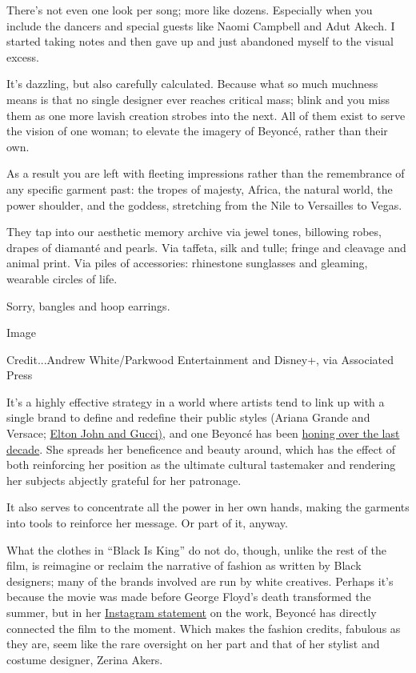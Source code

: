 There's not even one look per song; more like dozens. Especially when
you include the dancers and special guests like Naomi Campbell and Adut
Akech. I started taking notes and then gave up and just abandoned myself
to the visual excess.

It's dazzling, but also carefully calculated. Because what so much
muchness means is that no single designer ever reaches critical mass;
blink and you miss them as one more lavish creation strobes into the
next. All of them exist to serve the vision of one woman; to elevate the
imagery of Beyoncé, rather than their own.

As a result you are left with fleeting impressions rather than the
remembrance of any specific garment past: the tropes of majesty, Africa,
the natural world, the power shoulder, and the goddess, stretching from
the Nile to Versailles to Vegas.

They tap into our aesthetic memory archive via jewel tones, billowing
robes, drapes of diamanté and pearls. Via taffeta, silk and tulle;
fringe and cleavage and animal print. Via piles of accessories:
rhinestone sunglasses and gleaming, wearable circles of life.

Sorry, bangles and hoop earrings.

Image

Credit...Andrew White/Parkwood Entertainment and Disney+, via Associated
Press

It's a highly effective strategy in a world where artists tend to link
up with a single brand to define and redefine their public styles
(Ariana Grande and Versace;
\href{https://www.nytimes.com/2018/09/07/style/elton-john-farewell-tour-wardrobe-gucci.html}{Elton
John and Gucci)}, and one Beyoncé has been
\href{https://www.nytimes.com/2016/04/26/fashion/fashion-beyonce-lemonade.html}{honing
over the last decade}. She spreads her beneficence and beauty around,
which has the effect of both reinforcing her position as the ultimate
cultural tastemaker and rendering her subjects abjectly grateful for her
patronage.

It also serves to concentrate all the power in her own hands, making the
garments into tools to reinforce her message. Or part of it, anyway.

What the clothes in ``Black Is King'' do not do, though, unlike the rest
of the film, is reimagine or reclaim the narrative of fashion as written
by Black designers; many of the brands involved are run by white
creatives. Perhaps it's because the movie was made before George Floyd's
death transformed the summer, but in her
\href{https://www.instagram.com/p/CCAMxfrHjAL/}{Instagram statement} on
the work, Beyoncé has directly connected the film to the moment. Which
makes the fashion credits, fabulous as they are, seem like the rare
oversight on her part and that of her stylist and costume designer,
Zerina Akers.

